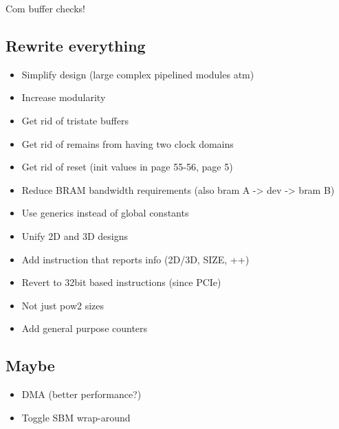 \TODO Com buffer checks!

\subsection{Rewrite everything}

\begin{itemize}
    \item Simplify design (large complex pipelined modules atm)
    \item Increase modularity
    \item Get rid of tristate buffers
    \item Get rid of remains from having two clock domains
    \item Get rid of reset (init values in \cite{ug687} page 55-56, \cite{wp272} page 5)
    \item Reduce BRAM bandwidth requirements (also bram A -> dev -> bram B)
    \item Use generics instead of global constants
    \item Unify 2D and 3D designs
    \item Add instruction that reports info (2D/3D, SIZE, ++)
    \item Revert to 32bit based instructions (since PCIe)
    \item Not just pow2 sizes
    \item Add general purpose counters
\end{itemize}

\subsection{Maybe}

\begin{itemize}
    \item DMA (better performance?)
    \item Toggle SBM wrap-around
\end{itemize}


